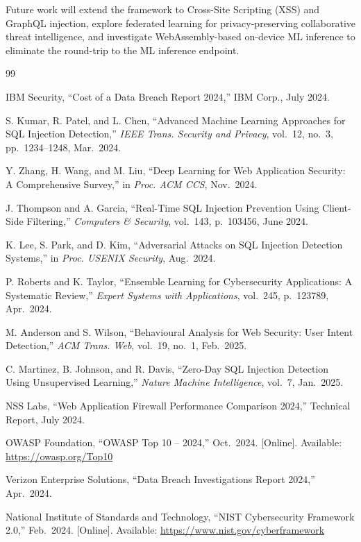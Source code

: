 \documentclass[10pt, twocolumn]{article}
\begin{document}
Future work will extend the framework to Cross-Site Scripting (XSS) and 
GraphQL injection, explore federated learning for privacy-preserving 
collaborative threat intelligence, and investigate WebAssembly-based 
on-device ML inference to eliminate the round-trip to the ML inference 
endpoint.

\balance
\begin{thebibliography}{99}

IBM Security, ``Cost of a Data Breach Report 2024,'' IBM Corp., July 2024.

S. Kumar, R. Patel, and L. Chen, ``Advanced Machine Learning Approaches for 
SQL Injection Detection,'' \textit{IEEE Trans. Security and Privacy}, vol.~12, 
no.~3, pp.~1234--1248, Mar.\ 2024.

Y. Zhang, H. Wang, and M. Liu, ``Deep Learning for Web Application Security: 
A Comprehensive Survey,'' in \textit{Proc. ACM CCS}, Nov.\ 2024.

J. Thompson and A. Garcia, ``Real-Time SQL Injection Prevention Using 
Client-Side Filtering,'' \textit{Computers \& Security}, vol.~143, 
p.~103456, June 2024.

K. Lee, S. Park, and D. Kim, ``Adversarial Attacks on SQL Injection Detection 
Systems,'' in \textit{Proc. USENIX Security}, Aug.\ 2024.

P. Roberts and K. Taylor, ``Ensemble Learning for Cybersecurity Applications: 
A Systematic Review,'' \textit{Expert Systems with Applications}, vol.~245, 
p.~123789, Apr.\ 2024.

M. Anderson and S. Wilson, ``Behavioural Analysis for Web Security: User 
Intent Detection,'' \textit{ACM Trans. Web}, vol.~19, no.~1, Feb.\ 2025.

C. Martinez, B. Johnson, and R. Davis, ``Zero-Day SQL Injection Detection 
Using Unsupervised Learning,'' \textit{Nature Machine Intelligence}, 
vol.~7, Jan.\ 2025.

NSS Labs, ``Web Application Firewall Performance Comparison 2024,'' 
Technical Report, July 2024.

OWASP Foundation, ``OWASP Top 10 -- 2024,'' Oct.\ 2024. 
[Online]. Available: \url{https://owasp.org/Top10}

Verizon Enterprise Solutions, ``Data Breach Investigations Report 2024,'' 
Apr.\ 2024.

National Institute of Standards and Technology, 
``NIST Cybersecurity Framework 2.0,'' Feb.\ 2024. 
[Online]. Available: \url{https://www.nist.gov/cyberframework}

\end{thebibliography}
\end{document}
